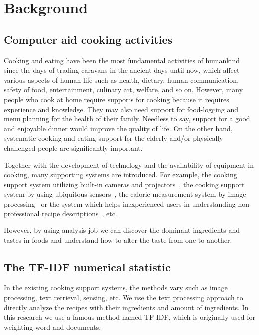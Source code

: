 \chapter{Background}\label{chap:bg}

\section{Computer aid cooking activities}

Cooking and eating have been the most fundamental activities of humankind since the days of trading caravans in the ancient days until now, which affect various aspects of human life such as health, dietary, human communication, safety of food, entertainment, culinary art, welfare, and so on. However, many people who cook at home require supports for cooking because it requires experience and knowledge. They may also need support for food-logging and menu planning for the health of their family. Needless to say, support for a good and enjoyable dinner would improve the quality of life. On the other hand, systematic cooking and eating support for the elderly and/or physically challenged people are significantly important.

Together with the development of technology and the availability of equipment in cooking, many supporting systems are introduced. For example, the cooking support system utilizing built-in cameras and projectors~\cite{morioka:camera-projecter}, the cooking support system by using ubiquitous sensors~\cite{nakauchi:recog}, the calorie measurement system by image processing~\cite{villalobos:image-calorie} or the system which helps inexperienced users in understanding non-professional recipe descriptions~\cite{ide:inexper}, etc. 


However, by using analysis job we can discover the dominant ingredients and tastes in foods and understand how to alter the taste from one to another. 

\section{The TF-IDF numerical statistic}

In the existing cooking support systems, the methods vary such as image processing, text retrieval, sensing, etc. We use the text processing approach to directly analyze the recipes with their ingredients and amount of ingredients. In this research we use a famous method named TF-IDF, which is originally used for weighting word and documents. 

